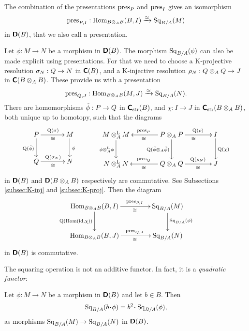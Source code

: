 The combination of the presentations $\operatorname{pres}_{P}$ and 
$\operatorname{pres}_{I}$ gives an isomorphism 
\[ \operatorname{pres}_{P, I} : 
\operatorname{Hom}_{B \otimes_{A} B}(B, I) \xrightarrow{\simeq} \operatorname{Sq}_{B / A}(M) \]
in $\boldsymbol{\mathsf{D}}(B)$, that we also call a presentation. 

Let $\phi : M \to N$ be a morphism in $\boldsymbol{\mathsf{D}}(B)$. The morphism 
$\operatorname{Sq}_{B / A}(\phi)$ can also be made explicit using presentations. 
For that we need to choose a K-projective resolution 
$\sigma_N : Q \to N$ in $\boldsymbol{\mathsf{C}}(B)$, and a K-injective resolution 
$\rho_N : Q \otimes_A Q \to J$ in $\boldsymbol{\mathsf{C}}(B \otimes_{A} B)$. 
These provide us with a presentation 
\[ \operatorname{pres}_{Q, J} : \operatorname{Hom}_{B \otimes_{A} B}(M, J) \xrightarrow{\simeq} \operatorname{Sq}_{B / A}(N) .
\]
There are homomorphisms
$\tilde{\phi} : P \to Q$ in $\boldsymbol{\mathsf{C}}_{\mathrm{str}}(B)$,
and 
$\chi : I \to J$ in $\boldsymbol{\mathsf{C}}_{\mathrm{str}}(B \otimes_{A} B)$,
both unique up to homotopy, such that the diagrams 
\[ \UseTips \xymatrix @C=8ex @R=6ex {
P
\ar[r]^{\opn{Q}(\si)}_{\cong}
\ar[d]_{\opn{Q}(\til{\phi})}
&
M
\ar[d]^{\phi}
\\
Q
\ar[r]^{\opn{Q}(\si_N)}_{\cong}
&
N
} 
\qquad \quad 
\UseTips \xymatrix @C=9ex @R=6ex {
M \ot^{\mrm{L}}_A M
\ar[d]_{\phi \ot^{\mrm{L}}_A \phi}
&
P \ot_A P
\ar[l]_{\opn{pres}_{P}}^{\cong}
\ar[r]^(0.6){\opn{Q}(\rho)}_{\cong}
\ar[d]_{\opn{Q}(\til{\phi} \ot_A \til{\phi})}
&
I
\ar[d]^{\opn{Q}(\chi)}
\\
N \ot^{\mrm{L}}_A N
&
Q \ot_A Q
\ar[l]_{\opn{pres}_{Q}}^{\cong}
\ar[r]^(0.6){\opn{Q}(\rho_N)}_(0.6){\cong}
&
J
}
\]
in $\boldsymbol{\mathsf{D}}(B)$ and $\boldsymbol{\mathsf{D}}(B \otimes_{A} B)$ respectively are commutative. 
See Subsections \ref{subsec:K-inj} and \ref{subsec:K-proj}. Then the diagram 
\begin{equation} \label{eqn:2329}
\UseTips \xymatrix @C=10ex @R=6ex {
\opn{Hom}_{B \ot_{A} B}(B, I)
\ar[r]^(0.55){\opn{pres}_{P, I}}_(0.55){\cong}
\ar[d]_{\opn{Q}(\opn{Hom}(\opn{id}, \chi))}
&
\opn{Sq}_{B / A}(M)
\ar[d]^{\opn{Sq}_{B / A}(\phi)}
\\
\opn{Hom}_{B \ot_{A} B}(B, J)
\ar[r]^(0.55){\opn{pres}_{Q, J}}_(0.55){\cong}
&
\opn{Sq}_{B / A}(N)
} 
\end{equation}
in $\boldsymbol{\mathsf{D}}(B)$ is commutative.

The squaring operation is not an additive functor. In fact, it is a 
{\em quadratic functor}:

\begin{thm} \label{thm:2325} 
Let $\phi : M \to N$ be a morphism in $\boldsymbol{\mathsf{D}}(B)$ and let $b \in B$.
Then 
\[ \operatorname{Sq}_{B / A}(b \mspace{1.5mu}{\cdot}\mspace{1.5mu} \phi) = b^2 \mspace{1.5mu}{\cdot}\mspace{1.5mu} \operatorname{Sq}_{B / A}(\phi) , \]
as morphisms 
$\operatorname{Sq}_{B / A}(M) \to \operatorname{Sq}_{B / A}(N)$ in $\boldsymbol{\mathsf{D}}(B)$. 
\end{thm}

